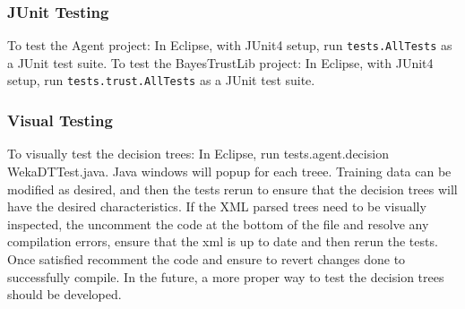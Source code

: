 \subsubsection{JUnit Testing}
To test the Agent project: In Eclipse, with JUnit4 setup, run
\verb+tests.AllTests+ as a JUnit test suite.  To test the BayesTrustLib project:
In Eclipse, with JUnit4 setup, run \verb+tests.trust.AllTests+ as a JUnit test
suite.

\subsubsection{Visual Testing}
To visually test the decision trees: In Eclipse, run tests.agent.decision WekaDTTest.java.
Java windows will popup for each treee.  Training data can be modified as desired,
and then the tests rerun to ensure that the decision trees will have the desired characteristics.
If the XML parsed trees need to be visually inspected, the uncomment the code at the bottom of the file
and resolve any compilation errors, ensure that the xml is up to date and then rerun the tests.  Once
satisfied recomment the code and ensure to revert changes done to successfully compile.  In the future, 
a more proper way to test the decision trees should be developed.
